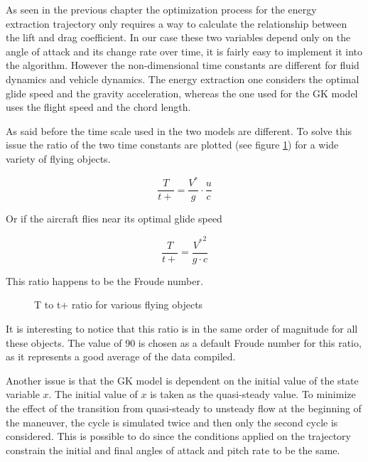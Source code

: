
\par As seen in the previous chapter the optimization process for the energy extraction trajectory only requires a way to calculate the relationship between the lift and drag coefficient.
In our case these two variables depend only on the angle of attack and its change rate over time, it is fairly easy to implement it into the algorithm.
However the non-dimensional time constants are different for fluid dynamics and vehicle dynamics.
The energy extraction one considers the optimal glide speed and the gravity acceleration, whereas the one used for the GK model uses the flight speed and the chord length.

As said before the time scale used in the two models are different.
To solve this issue the ratio of the two time constants are plotted (see figure \ref{fig:T_t+_ratio}) for a wide variety of flying objects.

\begin{equation}
  \frac{T}{t+}=\frac{V^*}{g} \cdot \frac{u}{c}
  \label{eqn:T_t+}
\end{equation}

Or if the aircraft flies near its optimal glide speed

\begin{equation}
  \frac{T}{t+}=\frac{{V^*}^2}{g \cdot c}
  \label{eqn:T_t+_ratio}
\end{equation}

This ratio happens to be the Froude number.


\begin{figure}[ht]
  \begin{center}
  \end{center}
  \caption{T to t+ ratio for various flying objects}
  \label{fig:T_t+_ratio}
\end{figure}

\par It is interesting to notice that this ratio is in the same order of magnitude for all these objects.
The value of 90 is chosen as a default Froude number for this ratio, as it represents a good average of the data compiled.


\par Another issue is that the GK model is dependent on the initial value of the state variable $x$.
The initial value of $x$ is taken as the quasi-steady value.
To minimize the effect of the transition from quasi-steady to unsteady flow at the beginning of the maneuver, the cycle is simulated twice and then only the second cycle is considered.
This is possible to do since the conditions applied on the trajectory constrain the initial and final angles of attack and pitch rate to be the same.



